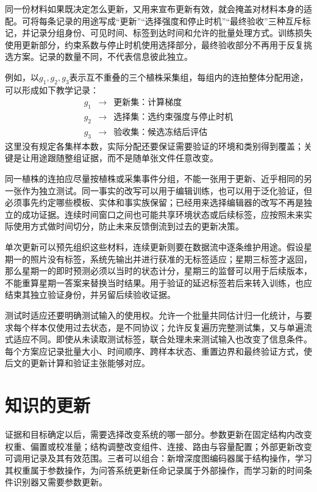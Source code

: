 同一份材料如果既决定怎么更新，又用来宣布更新有效，就会掩盖对材料本身的适配。可将每条记录的用途写成“更新”“选择强度和停止时机”“最终验收”三种互斥标记，并记录分组身份、可见时间、标签到达时间和允许的批量处理方式。训练损失使用更新部分，约束系数与停止时机使用选择部分，最终验收部分不再用于反复挑选方案。记录的数量不同，不代表信息彼此独立。

例如，以$g_1,g_2,g_3$表示互不重叠的三个植株采集组，每组内的连拍整体分配用途，可以形成如下教学记录：
\[
\begin{array}{ccl}
g_1&\longrightarrow&\text{更新集：计算梯度}\\
g_2&\longrightarrow&\text{选择集：选约束强度与停止时机}\\
g_3&\longrightarrow&\text{验收集：候选冻结后评估}
\end{array}
\]
这里没有规定各集样本数，实际分配还要保证需要验证的环境和类别得到覆盖；关键是让用途跟随整组证据，而不是随单张文件任意改变。

同一植株的连拍应尽量按植株或采集事件分组，不能一张用于更新、近乎相同的另一张作为独立测试。同一事实的改写可以用于编辑训练，也可以用于泛化验证，但必须事先约定哪些模板、实体和事实族保留；已经用来选择编辑器的改写不再是独立的成功证据。连续时间窗口之间也可能共享环境状态或后续标签，应按照未来实际使用方式做时间切分，防止未来反馈倒流到过去的更新决策。

单次更新可以预先组织这些材料，连续更新则要在数据流中逐条维护用途。假设星期一的照片没有标签，系统先输出并进行获准的无标签适应；星期三标签才返回，那么星期一的即时预测必须以当时的状态计分，星期三的监督可以用于后续版本，不能重算星期一答案来替换当时结果。用于验证的延迟标签若后来转入训练，也应结束其独立验证身份，并另留后续验收证据。

测试时适应还要明确测试输入的使用权。允许一个批量共同估计归一化统计，与要求每个样本仅使用过去状态，是不同协议；允许反复遍历完整测试集，又与单遍流式适应不同。即使从未读取测试标签，联合处理未来测试输入也改变了信息条件。每个方案应记录批量大小、时间顺序、跨样本状态、重置边界和最终验证方式，使后文的更新计算和验证主张能够对应。

\section{知识的更新}
\label{sec:ket-update-operations}

证据和目标确定以后，需要选择改变系统的哪一部分。参数更新在固定结构内改变权重、偏置或校准量；结构调整改变组件、连接、路由与容量配置；外部更新改变可调用记录及其有效范围。三者可以组合：新增深度图编码器属于结构操作，学习其权重属于参数操作，为问答系统更新任命记录属于外部操作，而学习新的时间条件识别器又需要参数更新。

